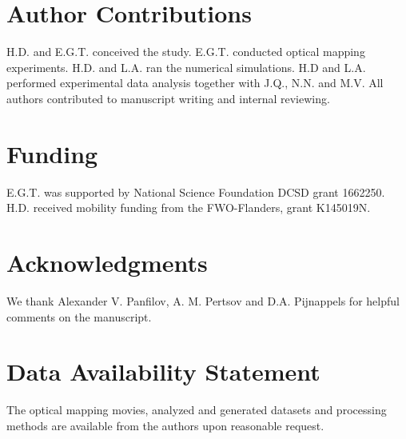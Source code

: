 \documentclass[aps,pre,amsfonts,amssymb,amsmath,twocolumn, superscriptaddress]{revtex4-1}
\begin{document}
\section*{Author Contributions}

H.D. and E.G.T. conceived the study. E.G.T. conducted optical mapping experiments. H.D. and L.A. ran the numerical simulations. H.D and L.A. performed experimental data analysis together with J.Q., N.N. and M.V. All authors contributed to manuscript writing and internal reviewing. 
\section*{Funding}
E.G.T. was supported by National Science Foundation DCSD grant 1662250. H.D. received mobility funding from the FWO-Flanders, grant K145019N. 

\section*{Acknowledgments}
We thank Alexander V. Panfilov, A. M. Pertsov and D.A. Pijnappels for helpful comments on the manuscript.


\section*{Data Availability Statement}
The optical mapping movies, analyzed and generated datasets and processing methods are available from the authors upon reasonable request.
%   

%




\end{document}
